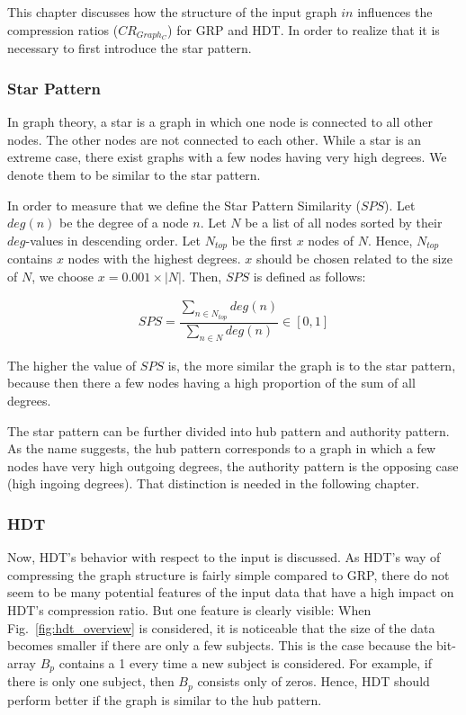 This chapter discusses how the structure of the input graph $in$ influences the compression ratios ($CR_{Graph_C}$) for GRP and HDT. In order to realize that it is necessary to first introduce the star pattern.

\subsubsection{Star Pattern}

In graph theory, a star is a graph in which one node is connected to all other nodes. The other nodes are not connected to each other. While a star is an extreme case, there exist graphs with a few nodes having very high degrees. We denote them to be similar to the star pattern. 

In order to measure that we define the Star Pattern Similarity ($SPS$). Let $deg(n)$ be the degree of a node $n$. Let $N$ be a list of all nodes sorted by their $deg$-values in descending order.  Let $N_{top}$ be the first $x$ nodes of $N$. Hence, $N_{top}$ contains $x$ nodes with the highest degrees. $x$ should be chosen related to the size of $N$, we choose $x=0.001 \times |N|$.  Then, $SPS$ is defined as follows:

\begin{align*}
SPS=\dfrac{\sum_{n \in N_{top}} deg(n)  }{\sum_{n \in N} deg(n)} \in [0,1]
\end{align*}

The higher the value of $SPS$ is, the more similar the graph is to the star pattern, because then there a few nodes having a high proportion of the sum of all degrees.

The star pattern can be further divided into hub pattern and authority pattern. As the name suggests, the hub pattern corresponds to a graph in which a few nodes have very high outgoing degrees, the authority pattern is the opposing case (high ingoing degrees). That distinction is needed in the following chapter.

\subsubsection{HDT}

Now, HDT's behavior with respect to the input is discussed. As HDT's way of compressing the graph structure is fairly simple compared to GRP, there do not seem to be many potential features of the input data that have a high impact on HDT's compression ratio. But one feature is clearly visible: When Fig.~\ref{fig:hdt_overview} is considered, it is noticeable that the size of the data becomes smaller if there are only a few subjects. This is the case because the bit-array $B_p$ contains a 1 every time a new subject is considered. For example, if there is only one subject, then $B_p$ consists only of zeros. Hence, HDT should perform better if the graph is similar to the hub pattern.

